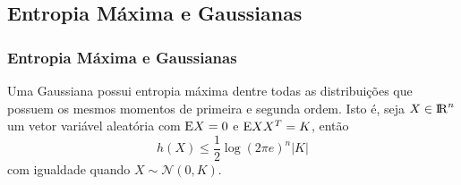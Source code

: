 \subsection{Entropia Máxima e Gaussianas}
\begin{frame}[allowframebreaks]
  \frametitle{Entropia Máxima e Gaussianas}

  \begin{theorem}
  Uma Gaussiana possui entropia máxima dentre todas as distribuições que possuem os mesmos
  momentos de primeira e segunda ordem. Isto é, seja $X \in {\rm I\!R}^n$ um vetor variável aleatória com $\mathrm{E} X = 0$
  e $\mathrm{E} X X^T = K$, então
	\begin{equation}
	h(X) \leq \frac{1}{2} \log (2\pi e)^n \vert K \vert
	\end{equation}
  com igualdade quando $X \sim \mathcal{N}(0,K)$.
  \end{theorem}

  \framebreak


\end{frame}
